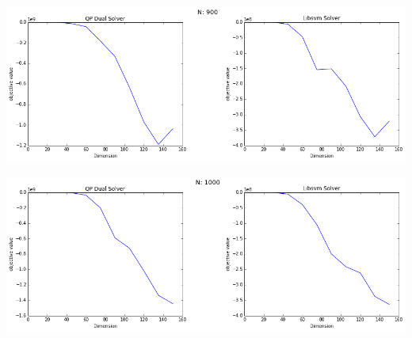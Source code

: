 \documentclass[12pt, a4paper]{article}
\begin{document}
			\begin{center}
				\includegraphics[width=18cm]{2par_obj_N900.png}
			\end{center}

			\begin{center}
				\includegraphics[width=18cm]{2par_obj_N1000.png}
			\end{center}
\end{document}
